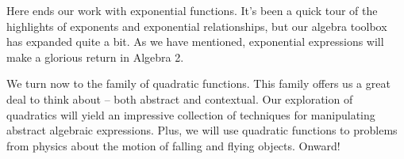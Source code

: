\chaptersummary

Here ends our work with exponential functions. It's been a quick tour of the highlights of exponents and exponential relationships, but our algebra toolbox has expanded quite a bit. As we have mentioned, exponential expressions will make a glorious return in Algebra 2.

We turn now to the family of quadratic functions. This family offers us a great deal to think about -- both abstract and contextual. Our exploration of quadratics will yield an impressive collection of techniques for manipulating abstract algebraic expressions. Plus, we will use quadratic functions to problems from physics about the motion of falling and flying objects. Onward!
